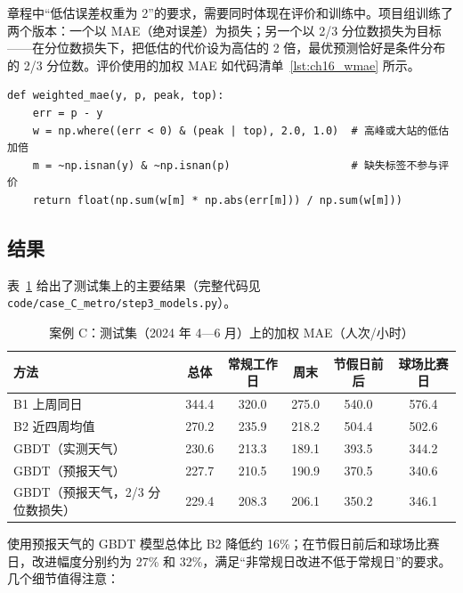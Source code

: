 章程中“低估误差权重为 2”的要求，需要同时体现在评价和训练中。项目组训练了两个版本：一个以 MAE（绝对误差）为损失；另一个以 2/3 分位数损失为目标——在分位数损失下，把低估的代价设为高估的 2 倍，最优预测恰好是条件分布的 2/3 分位数。评价使用的加权 MAE 如代码清单~\ref{lst:ch16_wmae} 所示。

\begin{lstlisting}[caption={案例 C：按章程定义的加权 MAE},label={lst:ch16_wmae}]
def weighted_mae(y, p, peak, top):
    err = p - y
    w = np.where((err < 0) & (peak | top), 2.0, 1.0)  # 高峰或大站的低估加倍
    m = ~np.isnan(y) & ~np.isnan(p)                   # 缺失标签不参与评价
    return float(np.sum(w[m] * np.abs(err[m])) / np.sum(w[m]))
\end{lstlisting}

\subsection{结果}

表~\ref{tab:ch16_results} 给出了测试集上的主要结果（完整代码见 \texttt{code/case\_C\_metro/step3\_models.py}）。

\begin{table}[H]
\centering
\caption{案例 C：测试集（2024 年 4—6 月）上的加权 MAE（人次/小时）}
\label{tab:ch16_results}
\small
\begin{tabular}{lccccc}
\toprule
方法 & 总体 & 常规工作日 & 周末 & 节假日前后 & 球场比赛日 \\
\midrule
B1 上周同日 & 344.4 & 320.0 & 275.0 & 540.0 & 576.4 \\
B2 近四周均值 & 270.2 & 235.9 & 218.2 & 504.4 & 502.6 \\
GBDT（实测天气） & 230.6 & 213.3 & 189.1 & 393.5 & 344.2 \\
GBDT（预报天气） & 227.7 & 210.5 & 190.9 & 370.5 & 340.6 \\
GBDT（预报天气，2/3 分位数损失） & 229.4 & 208.3 & 206.1 & 350.2 & 346.1 \\
\bottomrule
\end{tabular}
\end{table}

使用预报天气的 GBDT 模型总体比 B2 降低约 16\%；在节假日前后和球场比赛日，改进幅度分别约为 27\% 和 32\%，满足“非常规日改进不低于常规日”的要求。几个细节值得注意：

